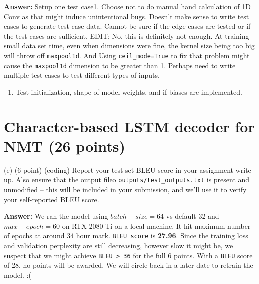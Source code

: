 \documentclass{article}
\begin{document}
\bigbreak
\noindent
\textbf{Answer:} Setup one test case1. Choose not to do manual hand calculation of 1D Conv as that might induce unintentional bugs. Doesn't make sense to write test cases to generate test case data.  Cannot be sure if the edge cases are tested or if the test cases are sufficient. EDIT: No, this is definitely not enough. At training small data set time, even when dimensions were fine, the kernel size being too big will throw off \verb|maxpool1d|. And Using \verb|ceil_mode=True| to fix that problem might cause the \verb|maxpool1d| dimension to be greater than 1. Perhaps need to write multiple test cases to test different types of inputs.
\begin{enumerate}
\item Test initialization, shape of model weights, and if biases are implemented.
\end{enumerate}

\section{Character-based LSTM decoder for NMT (26 points)}
\bigbreak
(e) (6 point) (coding) Report your test set BLEU score in your assignment write-up.  Also ensure that the output fileo \verb|outputs/test_outputs.txt| is present and unmodified – this will be included in your submission, and we’ll use it to verify your self-reported BLEU score. 

\bigbreak
\noindent
\textbf{Answer:} We ran the model using $batch-size=64$ vs default 32 and $max-epoch=60$ on RTX 2080 Ti on a local machine. It hit maximum number of epochs at around 34 hour mark. \verb|BLEU score| is \textbf{27.96}. Since the training loss and validation perplexity are still decreasing, however slow it might be, we suspect that we might achieve \verb|BLEU > 36| for the full 6 points. With a \verb|BLEU| score of 28, no points will be awarded. We will circle back in a later date to retrain the model. :(
\end{document}
